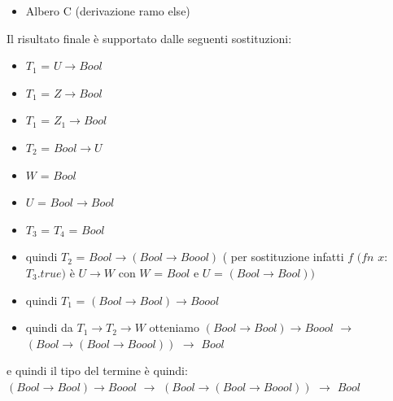 \begin{enumerate}[label=\textbf{\alph*}), leftmargin=*]
\begin{itemize}[label=$\star$]
		
		
		\item 	Albero C (derivazione ramo else)\\
		
		\vspace{1cm}					
		
		
		\end{itemize}				
		
		Il risultato finale \`e supportato dalle seguenti sostituzioni:
		\begin{itemize}
		
		\item $T_1$ = $U \rightarrow Bool$
		\item $T_1$ = $Z \rightarrow Bool$
		\item $T_1$ = $Z_1 \rightarrow Bool$
		\item $T_2$ = $Bool \rightarrow U$
		\item $W$ = $Bool$
		\item $U$ = $Bool \rightarrow Bool$
		\item $T_3$ = $T_4$ = $Bool$
		
		\item quindi $T_2$ = $Bool \rightarrow (Bool \rightarrow Boool)$ ( per sostituzione infatti $f$ $(fn$ $x$:$T_3.true)$ \`e $U \rightarrow W$ con $W$ = $Bool$ e $U$ = $(Bool \rightarrow Bool))$
		\item quindi $T_1$ =  $(Bool \rightarrow Bool) \rightarrow Boool$
		\item quindi da $T_1 \rightarrow T_2 \rightarrow W$ otteniamo $(Bool \rightarrow Bool) \rightarrow Boool$ $\rightarrow$ $(Bool \rightarrow (Bool \rightarrow Boool))$ $\rightarrow$ $Bool$
		
		
		
		\end{itemize}
		e quindi il tipo del termine \`e quindi:\\  $(Bool \rightarrow Bool) \rightarrow Boool$ $\rightarrow$ $(Bool \rightarrow (Bool \rightarrow Boool))$ $\rightarrow$ $Bool$
		

\end{enumerate}